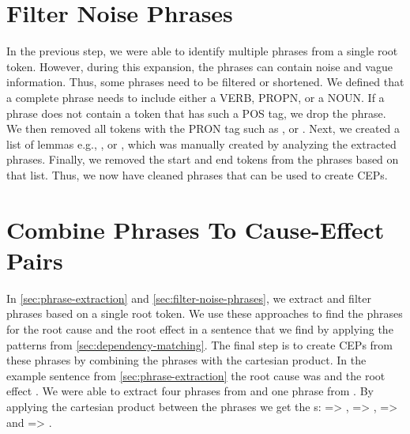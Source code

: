\section{Filter Noise Phrases}\label{sec:filter-noise-phrases}
In the previous step, we were able to identify multiple phrases from a single root token.
However, during this expansion, the phrases can contain noise and vague information.
Thus, some phrases need to be filtered or shortened.
We defined that a complete phrase needs to include either a VERB, PROPN, or a NOUN. If a phrase does not contain a token that has such a \ac{POS} tag, we drop the phrase.
We then removed all tokens with the PRON tag such as ,  or .
Next, we created a list of lemmas e.g., ,  or , which was manually created by analyzing the extracted phrases.
Finally, we removed the start and end tokens from the phrases based on that list.
Thus, we now have cleaned phrases that can be used to create \ac{CEP}s.


\section{Combine Phrases To Cause-Effect Pairs}\label{sec:combine-the-phrases-to-a-pair}
In \autoref{sec:phrase-extraction} and \autoref{sec:filter-noise-phrases}, we extract and filter phrases based on a single root token.
We use these approaches to find the phrases for the root cause and the root effect in a sentence that we find by applying the patterns from \autoref{sec:dependency-matching}.
The final step is to create \ac{CEP}s from these phrases by combining the phrases with the cartesian product.
In the example sentence from \autoref{sec:phrase-extraction} the root cause was  and the root effect .
We were able to extract four phrases from  and one phrase from .
By applying the cartesian product between the phrases we get the s:  => ,  => ,  =>  and  => .
